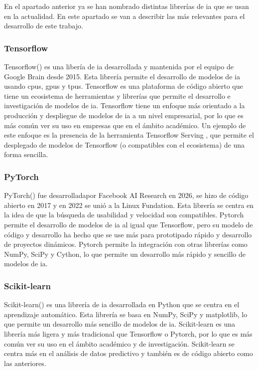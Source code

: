 En el apartado anterior ya se han nombrado distintas librerías de \gls{ia} que se usan en la actualidad. En este apartado se van a describir las más relevantes para el desarrollo de este trabajo.

\subsubsection{Tensorflow}

Tensorflow(\cite{tensorflow2015-whitepaper}) es una libería de \gls{ia} desarrollada y mantenida por el equipo de Google Brain desde 2015. Esta librería permite el desarrollo de modelos de \gls{ia} usando \glspl{cpu}, \glspl{gpu} y \glspl{tpu}. Tensorflow es una plataforma de código abierto que tiene un ecosistema de herramientas y librerías que permite el desarrollo e investigación de modelos de \gls{ia}.
Tensorflow tiene un enfoque más orientado a la producción y despliegue de modelos de \gls{ia} a un nivel empresarial, por lo que es más común ver su uso en empresas que en el ámbito académico. Un ejemplo de este enfoque es la presencia de la herramienta Tensorflow Serving \cite{olston2017tensorflowservingflexiblehighperformanceml}, que permite el desplegado de modelos de Tensorflow (o compatibles con el ecosistema) de una forma sencilla.

\subsubsection{PyTorch}
PyTorch(\cite{Ansel_PyTorch_2_Faster_2024}) fue desarrolladapor Facebook AI Research en 2026, se hizo de código abierto en 2017 y en 2022 se unió a la Linux Fundation. Esta librería se centra en la idea de que la búsqueda de usabilidad y velocidad son compatibles. Pytorch permite el desarrollo de modelos de \gls{ia} al igual que Tensorflow, pero su modelo de código y desarrollo ha hecho que se use más para prototipado rápido y desarrollo de proyectos dinámicos.
Pytorch permite la integración con otras librerías como NumPy, SciPy y Cython, lo que permite un desarrollo más rápido y sencillo de modelos de \gls{ia}.

\subsubsection{Scikit-learn}
Scikit-learn(\cite{scikit-learn}) es una librería de \gls{ia} desarrollada en Python que se centra en el aprendizaje automático. Esta librería se basa en NumPy, SciPy y matplotlib, lo que permite un desarrollo más sencillo de modelos de \gls{ia}. Scikit-learn es una librería más ligera y más tradicional que Tensorflow o Pytorch, por lo que es más común ver su uso en el ámbito académico y de investigación. Scikit-learn se centra más en el análisis de datos predictivo y también es de código abierto como las anteriores.

